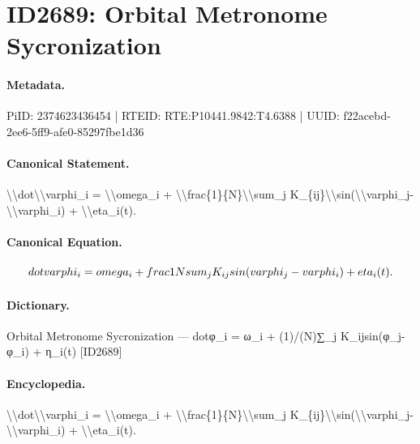 \section*{ID2689: Orbital Metronome Sycronization}
\paragraph{Metadata.}
PiID: 2374623436454 | RTEID: RTE:P10441.9842:T4.6388 | UUID: f22acebd-2ee6-5ff9-afe0-85297fbe1d36

\paragraph{Canonical Statement.}
\textbackslash{}\textbackslash{}dot\textbackslash{}\textbackslash{}varphi\_i = \textbackslash{}\textbackslash{}omega\_i + \textbackslash{}\textbackslash{}frac\{1\}\{N\}\textbackslash{}\textbackslash{}sum\_j K\_\{ij\}\textbackslash{}\textbackslash{}sin(\textbackslash{}\textbackslash{}varphi\_j-\textbackslash{}\textbackslash{}varphi\_i) + \textbackslash{}\textbackslash{}eta\_i(t).

\paragraph{Canonical Equation.}
\[
\\dot\\varphi_i = \\omega_i + \\frac{1}{N}\\sum_j K_{ij}\\sin(\\varphi_j-\\varphi_i) + \\eta_i(t).
\]

\paragraph{Dictionary.}
Orbital Metronome Sycronization — dotφ\_i = ω\_i + (1)/(N)∑\_j K\_ijsin(φ\_j-φ\_i) + η\_i(t) [ID2689]

\paragraph{Encyclopedia.}
\textbackslash{}\textbackslash{}dot\textbackslash{}\textbackslash{}varphi\_i = \textbackslash{}\textbackslash{}omega\_i + \textbackslash{}\textbackslash{}frac\{1\}\{N\}\textbackslash{}\textbackslash{}sum\_j K\_\{ij\}\textbackslash{}\textbackslash{}sin(\textbackslash{}\textbackslash{}varphi\_j-\textbackslash{}\textbackslash{}varphi\_i) + \textbackslash{}\textbackslash{}eta\_i(t).
